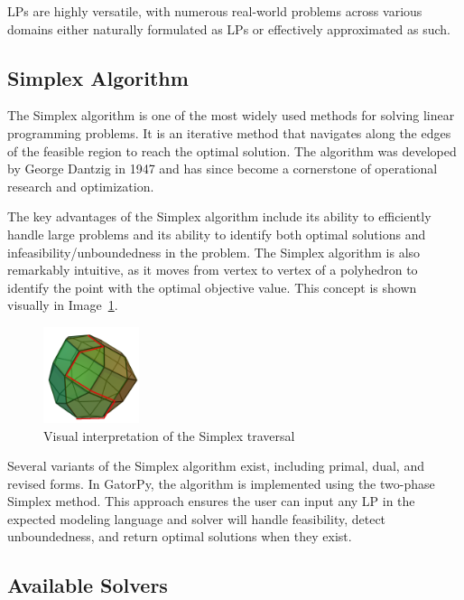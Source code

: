 \documentclass[conference]{IEEEtran}
\begin{document}
LPs are highly versatile, with numerous real-world problems across various domains either naturally formulated as LPs or effectively approximated as such.

\subsection{Simplex Algorithm}

The Simplex algorithm is one of the most widely used methods for solving linear programming problems. 
It is an iterative method that navigates along the edges of the feasible region to reach the optimal solution. 
The algorithm was developed by George Dantzig in 1947 and has since become a cornerstone of operational research and optimization.

The key advantages of the Simplex algorithm include its ability to efficiently handle large problems and its ability to identify both optimal solutions and infeasibility/unboundedness in the problem. 
The Simplex algorithm is also remarkably intuitive, as it moves from vertex to vertex of a polyhedron to identify the point with the optimal objective value.
This concept is shown visually  in Image~\ref{fig:simplex}.

\begin{figure}[htbp]
  \centerline{\includegraphics[width=0.25\textwidth]{images/simplex.png}}
  \caption{Visual interpretation of the Simplex traversal \cite{img:simplex}}
  \label{fig:simplex}
\end{figure}

Several variants of the Simplex algorithm exist, including primal, dual, and revised forms. 
In GatorPy, the algorithm is implemented using the two-phase Simplex method.
This approach ensures the user can input any LP in the expected modeling language and solver will handle feasibility, detect unboundedness, and return optimal solutions when they exist.

\subsection{Available Solvers}
\end{document}

